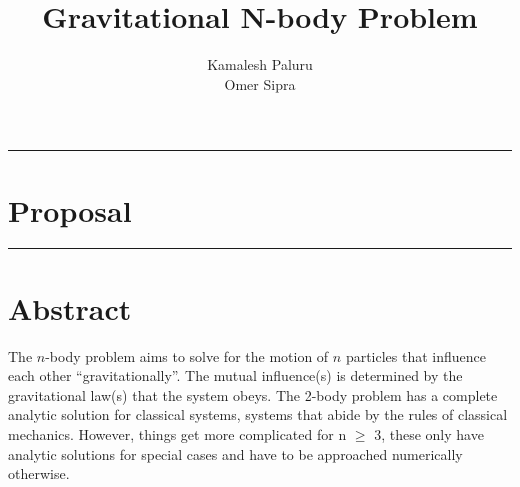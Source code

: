 \documentclass[hidelinks, 11pt]{article}
\title{Gravitational N-body Problem}
\author{Kamalesh Paluru \\ Omer Sipra}
\newcommand{\psection}[1]{{
    \begin{center}
        \noindent \rule{17cm}{0.4pt}
            \section*{\LARGE #1}
        \noindent \rule{17cm}{0.4pt}
    \end{center}
}}
\newcommand{\psubsection}[1]{
    \noindent 
    \section*{#1}
}
\begin{document}
\maketitle

\newpage

\psection{Proposal}

\psubsection{Abstract}
The $n$-body problem aims to solve for the motion of $n$ particles that influence each other ``gravitationally''. The mutual influence(s) is determined by the gravitational law(s) that the system obeys. The 2-body problem has a complete analytic solution for classical systems, systems that abide by the rules of classical mechanics. However, things get more complicated for n $\ge$ 3, these only have analytic solutions for special cases and have to be approached numerically otherwise.
\end{document}

